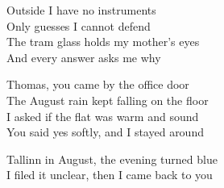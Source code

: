 \begin{lyrics}
Outside I have no instruments\\
Only guesses I cannot defend\\
The tram glass holds my mother's eyes\\
And every answer asks me why

Thomas, you came by the office door\\
The August rain kept falling on the floor\\
I asked if the flat was warm and sound\\
You said yes softly, and I stayed around

Tallinn in August, the evening turned blue\\
I filed it unclear, then I came back to you
\end{lyrics}


